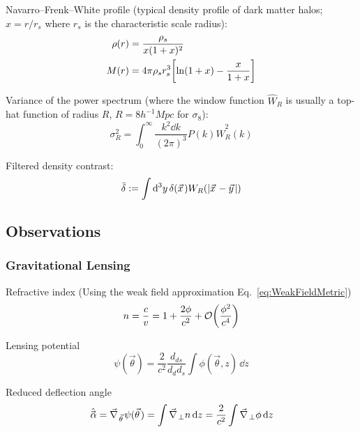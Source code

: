 		\noindent
		Navarro--Frenk--White profile (typical density profile of dark matter halos; $x=r/r_s$ where $r_s$ is the characteristic scale radius):
		\begin{align}
			\rho(r) &= \frac{\rho_s}{x(1+x)^2} \\
			M(r) &= 4\pi \rho_s r_s^3 \qty[\ln(1+x) - \frac{x}{1+x}]
		\end{align}

		\noindent
		Variance of the power spectrum (where the window function $\hat{W}_R$ is usually a top-hat function of radius $R$, \eg $R=8h^{-1}\unit{Mpc}$ for $\sigma_8$):
		\begin{equation}
			\sigma_R^2 = \int_{0}^{\infty} \frac{k^2 \dd k}{(2\pi)^3} P(k) \hat{W}^2_R(k)
		\end{equation}

		\noindent
		Filtered density contrast:
		\begin{equation}
			\bar{\delta} := \int \dd^3 y \, \delta(\vec{x}) W_R(\abs{\vec{x}-\vec{y}})
		\end{equation}

	\subsection{Observations}
		\subsubsection{Gravitational Lensing}
			Refractive index (Using the weak field approximation Eq.~\ref{eq:WeakFieldMetric})
			\begin{equation}
				n = \frac{c}{v} = 1 + \frac{2 \phi}{c^2} + \mathcal{O}\qty(\frac{\phi^2}{c^4})
			\end{equation}

			\noindent
			Lensing potential
			\begin{equation}
				\psi (\vec{\theta})  = \frac{2}{c^2} \frac{d_{ds}}{d_d d_s} \int \phi(\vec{\theta}, z) \, \dd z
			\end{equation}

			\noindent
			Reduced deflection angle
			\begin{equation}
				\hat{\vec{\alpha}}
				= \Nabla_{\vec{\theta}} \psi(\vec{\theta})
				= \int \Nabla_\perp n \, \dd z
				= \frac{2}{c^2} \int \Nabla_\perp \phi \, \dd z
			\end{equation}

